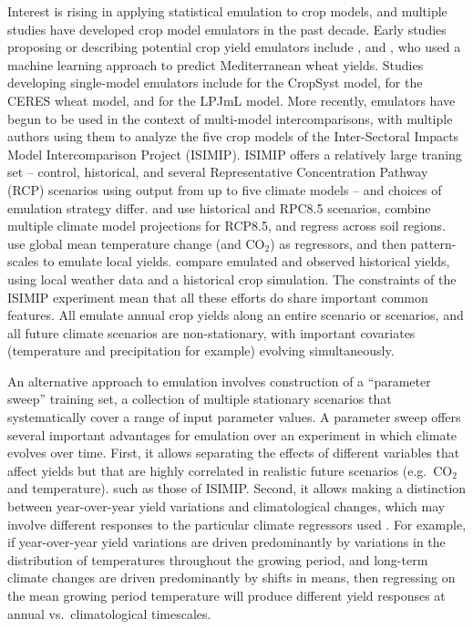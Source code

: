 \documentclass[gmd, manuscript]{copernicus} %
\begin{document}
Interest is rising in applying statistical emulation to crop models, and multiple studies have developed crop model emulators in the past decade.
Early studies proposing or describing potential crop yield emulators include \citet{Howden2005, raisen2006, Lobell2010}, and \citet{Ferrise2011}, who used a machine learning approach to predict Mediterranean wheat yields. 
Studies developing single-model emulators include  \citet{Holzkamper2012} for the CropSyst model, \citet{RUANE2013a} for the CERES wheat model, and \citet{Oyebamiji15} for the LPJmL model. 
More recently, emulators have begun to be used in the context of multi-model intercomparisons, with multiple authors \citep{BLANC2015, BLANC2017, Ostberg2018, Mistry2017}  using them to analyze the five crop models  of the Inter-Sectoral Impacts Model Intercomparison Project (ISIMIP). ISIMIP offers a relatively large traning set --  control, historical, and several Representative Concentration Pathway (RCP) scenarios using output from up to five climate models \citep{Warszawski3228, Frieler2017} -- and choices of emulation strategy differ.
\citet{BLANC2015} and \citet{BLANC2017} use historical and RPC8.5 scenarios, combine multiple climate model projections for RCP8.5, and regress across soil regions. 
\citet{Ostberg2018} use global mean temperature change (and CO$_2$) as regressors, and then pattern-scales to emulate local yields. 
\citet{Mistry2017} compare emulated and observed historical yields, using local weather data and a historical crop simulation. 
The constraints of the ISIMIP experiment mean that all these efforts do share important common features. 
All emulate annual crop yields along an entire scenario or scenarios, and all future climate scenarios are non-stationary, with important covariates (temperature and precipitation for example) evolving simultaneously. %

An alternative approach to emulation involves construction of a ``parameter sweep'' training set, a collection of multiple stationary scenarios that systematically cover a range of input parameter values.
A parameter sweep offers several important advantages for emulation over an experiment in which climate evolves over time. 
First, it allows separating the effects of different variables that affect yields but that are highly correlated in realistic future scenarios (e.g.\ CO$_2$ and temperature). 
such as those of ISIMIP.
Second, it allows making a distinction between year-over-year yield variations and climatological changes, which may involve different responses to the particular climate regressors used \citep[e.g.][]{Ruane2016}. 
For example, if year-over-year yield variations are driven predominantly by variations in the distribution of temperatures throughout the growing period, and long-term climate changes are driven predominantly by shifts in means, then regressing on the mean growing period temperature will produce different yield responses at annual vs.\ climatological timescales.  
\end{document}
